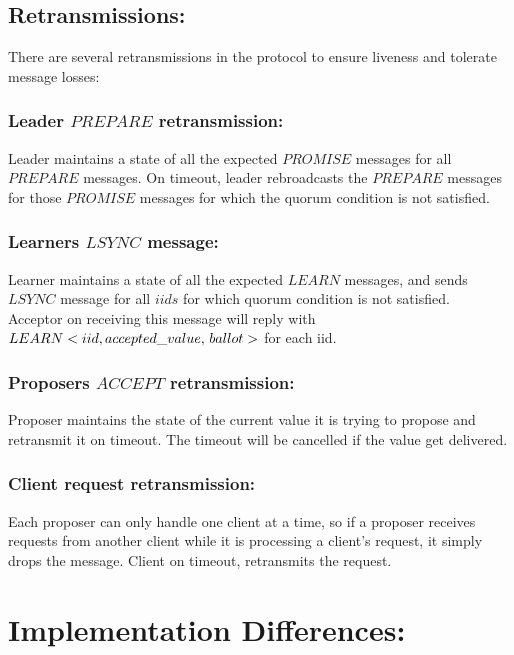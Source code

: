 \subsection{Retransmissions:}
There are several retransmissions in the protocol to ensure liveness and tolerate message losses:
\subsubsection{Leader $PREPARE$ retransmission:}
Leader maintains a state of all the expected $PROMISE$ messages for all $PREPARE$ messages. On timeout, leader rebroadcasts the $PREPARE$ messages for those $PROMISE$ messages for which the quorum condition is not satisfied.
\subsubsection{Learners $LSYNC$ message:}
Learner maintains a state of all the expected $LEARN$ messages, and sends $LSYNC$ message for all $iids$ for which quorum condition is not satisfied. \\

\noindent Acceptor on receiving this message will reply with $LEARN<iid,\, \\accepted\_value,\, ballot>$ for each iid.

\subsubsection{Proposers $ACCEPT$ retransmission:}
Proposer maintains the state of the current value it is trying to propose and retransmit it on timeout. The timeout will be cancelled if the value get delivered.

\subsubsection{Client request retransmission:}
Each proposer can only handle one client at a time, so if a proposer receives requests from another client while it is processing a client's request, it simply drops the message. Client on timeout, retransmits the request.

\section{Implementation Differences:}

